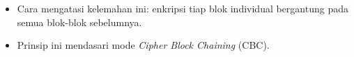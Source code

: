 \documentclass{article}
\begin{document}

\begin{itemize}
    \item Cara mengatasi kelemahan ini: enkripsi tiap blok individual bergantung pada semua blok-blok sebelumnya.
    \item Prinsip ini mendasari mode \textit{Cipher Block Chaining} (CBC).
\end{itemize}
\end{document}
